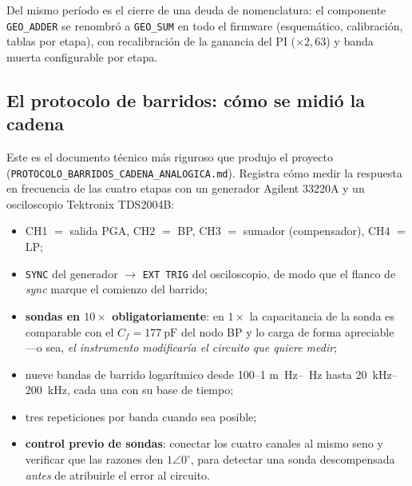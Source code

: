 
Del mismo per\'iodo es el cierre de una deuda de nomenclatura: el componente
\texttt{GEO\_ADDER} se renombr\'o a \texttt{GEO\_SUM} en todo el firmware
(esquem\'atico, calibraci\'on, tablas por etapa), con recalibraci\'on de la
ganancia del PI ($\times2{,}63$) y banda muerta configurable por etapa.

\subsection{El protocolo de barridos: c\'omo se midi\'o la cadena}

Este es el documento t\'ecnico m\'as riguroso que produjo el proyecto
(\texttt{PROTOCOLO\_BARRIDOS\_CADENA\_ANALOGICA.md}). Registra c\'omo medir la
respuesta en frecuencia de las cuatro etapas con un generador Agilent 33220A y
un osciloscopio Tektronix TDS2004B:

\begin{itemize}[itemsep=0.2em]
\item CH1 $=$ salida PGA, CH2 $=$ BP, CH3 $=$ sumador (compensador), CH4 $=$ LP;
\item \texttt{SYNC} del generador $\to$ \texttt{EXT TRIG} del osciloscopio, de
modo que el flanco de \emph{sync} marque el comienzo del barrido;
\item \textbf{sondas en $10\times$ obligatoriamente}: en $1\times$ la
capacitancia de la sonda es comparable con el $C_f = \SI{177}{\pico\farad}$ del
nodo BP y lo carga de forma apreciable ---o sea, \emph{el instrumento
modificar\'ia el circuito que quiere medir};
\item nueve bandas de barrido logar\'itmico desde
\SIrange{100}{1}{} m\SI{}{\hertz}--\SI{}{\hertz} hasta
\SIrange{20}{200}{\kilo\hertz}, cada una con su base de tiempo;
\item tres repeticiones por banda cuando sea posible;
\item \textbf{control previo de sondas}: conectar los cuatro canales al mismo
seno y verificar que las razones den $1\angle 0^{\circ}$, para detectar una
sonda descompensada \emph{antes} de atribuirle el error al circuito.
\end{itemize}

